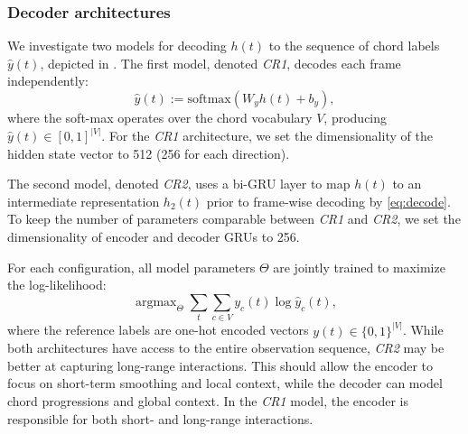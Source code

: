 \documentclass{article}
\DeclareMathOperator*{\argmax}{argmax}
\begin{document}
\subsubsection{Decoder architectures}
We investigate two models for decoding $h(t)$ to the sequence of chord labels $\hat{y}(t)$, depicted in .
The first model, denoted \emph{CR1}, decodes each frame independently:
\begin{equation}
    \hat{y}(t) := \text{softmax}\left(W_y h(t) + b_y\right),\label{eq:decode}
\end{equation}
where the soft-max operates over the chord vocabulary $V$, producing $\hat{y}(t) \in {[0,1]}^{|V|}$.
For the \emph{CR1} architecture, we set the dimensionality of the hidden state vector to 512 (256 for each direction).

The second model, denoted \emph{CR2}, uses a bi-GRU layer to map $h(t)$ to an intermediate representation $h_2(t)$ prior to frame-wise decoding by \cref{eq:decode}.
To keep the number of parameters comparable between \emph{CR1} and \emph{CR2}, we set the dimensionality of encoder and decoder GRUs to 256.

For each configuration, all model parameters $\Theta$ are jointly trained to maximize the log-likelihood:
\begin{equation}
    \argmax_\Theta    \sum_t \sum_{c \in V} y_c(t) \log \hat{y}_c(t), \label{objective}
\end{equation}
where the reference labels are one-hot encoded vectors $y(t) \in {\{0,1\}}^{|V|}$.
While both architectures have access to the entire observation sequence, \emph{CR2} may be better at capturing long-range interactions.
This should allow the encoder to focus on short-term smoothing and local context, while the decoder can model chord progressions and global context.
In the \emph{CR1} model, the encoder is responsible for both short- and long-range interactions.
\end{document}
